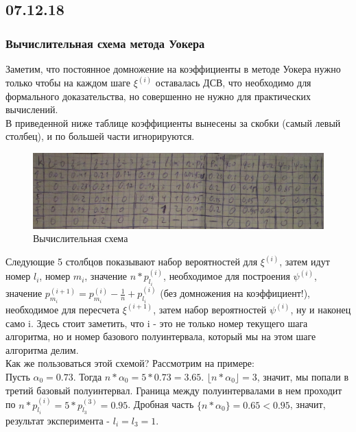 \subsection{07.12.18}
\subsubsection{Вычислительная схема метода Уокера}
Заметим, что постоянное домножение на коэффициенты в методе Уокера нужно только чтобы на каждом шаге $\xi^{(i)}$ оставалась ДСВ, что необходимо для формального доказательства, но совершенно не нужно для практических вычислений.\\
В приведенной ниже таблице коэффициенты вынесены за скобки (самый левый столбец), и по большей части игнорируются.\\
\begin{figure}[H]
\includegraphics[width=\linewidth]{WalkerTable.png}
\caption{Вычислительная схема}
\label{fig:WalkerTable}
\end{figure}
Следующие 5 столбцов показывают набор вероятностей для $\xi^{(i)}$, затем идут номер $l_i$, номер $m_i$, значение $n * p^{(i)}_{l_i}$, необходимое для построения $\psi^{(i)}$, значение $p^{(i + 1)}_{m_i} = p^{(i)}_{m_i} - \frac{1}{n} + p^{(i)}_{l_i}$ (без домножения на коэффициент!), необходимое для пересчета $\xi^{(i + 1)}$, затем набор вероятностей $\psi^{(i)}$, ну и наконец само i. Здесь стоит заметить, что i - это не только номер текущего шага алгоритма, но и номер базового полуинтервала, который мы на этом шаге алгоритма делим.\\
Как же пользоваться этой схемой? Рассмотрим на примере:\\
Пусть $\alpha_0 = 0.73$. Тогда $n * \alpha_0 = 5 * 0.73 = 3.65$. $\lfloor n * \alpha_0 \rfloor = 3$, значит, мы попали в третий базовый полуинтервал. Граница между полуинтервалами в нем проходит по $n * p^{(i)}_{l_i} = 5 * p^{(3)}_{l_3} = 0.95$. Дробная часть  $\{n * \alpha_0\} = 0.65 < 0.95$, значит, результат эксперимента - $l_i = l_3 = 1$.
